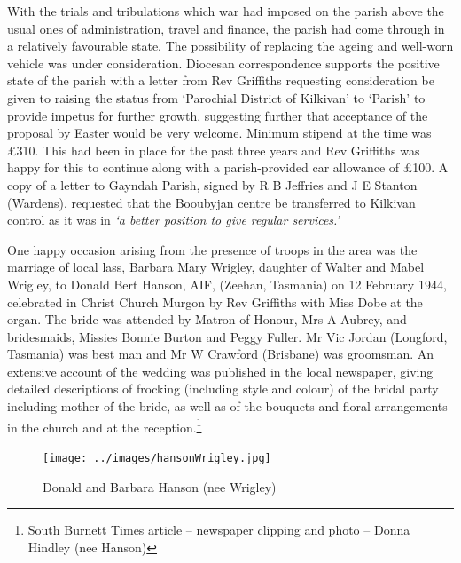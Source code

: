With the trials and tribulations which war had imposed on the parish above the usual ones of administration, travel and finance, the parish had come through in a relatively favourable state. The possibility of replacing the ageing and well-worn vehicle was under consideration. Diocesan correspondence supports the positive state of the parish with a letter from Rev Griffiths requesting consideration be given to raising the status from `Parochial District of Kilkivan' to `Parish' to provide impetus for further growth, suggesting further that acceptance of the proposal by Easter would be very welcome. Minimum stipend at the time was \pounds310. This had been in place for the past three years and Rev Griffiths was happy for this to continue along with a parish-provided car allowance of \pounds100. A copy of a letter to Gayndah Parish, signed by R B Jeffries and J E Stanton (Wardens), requested that the Booubyjan centre be transferred to Kilkivan control as it was in \emph{`a better position to give regular services.'}



One happy occasion arising from the presence of troops in the area was the marriage of local lass, Barbara Mary Wrigley, daughter of Walter and Mabel Wrigley, to Donald Bert Hanson, AIF, (Zeehan, Tasmania) on 12 February 1944, celebrated in Christ Church Murgon by Rev Griffiths with Miss Dobe at the organ. The bride was attended by Matron of Honour, Mrs A Aubrey, and bridesmaids, Missies Bonnie Burton and Peggy Fuller. Mr Vic Jordan (Longford, Tasmania) was best man and Mr W Crawford (Brisbane) was groomsman. An extensive account of the wedding was published in the local newspaper, giving detailed descriptions of frocking (including style and colour) of the bridal party including mother of the bride, as well as of the bouquets and floral arrangements in the church and at the reception.\footnote{South Burnett Times article -- newspaper clipping and photo -- Donna Hindley (nee Hanson)}








\begin{figure}
\begin{center}
\texttt{[image: ../images/hansonWrigley.jpg]}
\caption{Donald and Barbara Hanson (nee Wrigley)}
\end{center}
\end{figure}





